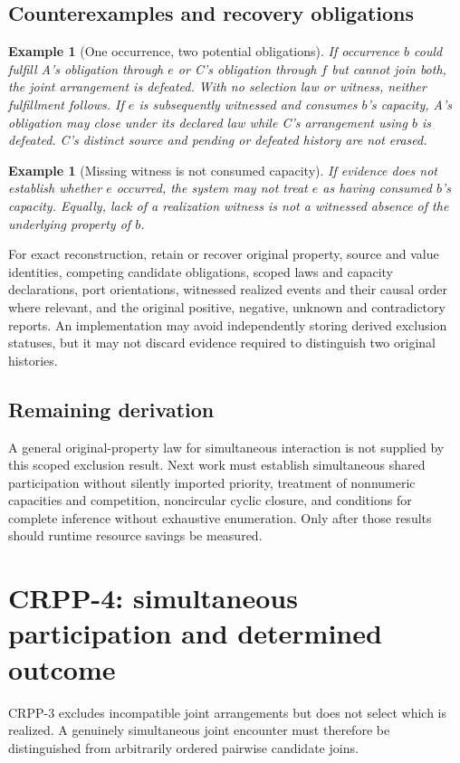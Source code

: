 \documentclass[11pt]{article}
\newtheorem{example}[definition]{Example}
\begin{document}
\subsection{Counterexamples and recovery obligations}
\begin{example}[One occurrence, two potential obligations]
If occurrence $b$ could fulfill A's obligation through $e$
or C's obligation through $f$ but cannot join both,
the joint arrangement is defeated. With no selection law or
witness, neither fulfillment follows. If $e$ is subsequently
witnessed and consumes $b$'s capacity, A's obligation may
close under its declared law while C's arrangement using $b$
is defeated. C's distinct source and pending or defeated
history are not erased.
\end{example}

\begin{example}[Missing witness is not consumed capacity]
If evidence does not establish whether $e$ occurred, the system
may not treat $e$ as having consumed $b$'s capacity. Equally,
lack of a realization witness is not a witnessed absence of
the underlying property of $b$.
\end{example}

For exact reconstruction, retain or recover original property,
source and value identities, competing candidate obligations,
scoped laws and capacity declarations, port orientations,
witnessed realized events and their causal order where relevant,
and the original positive, negative, unknown and contradictory
reports. An implementation may avoid independently storing
derived exclusion statuses, but it may not discard evidence
required to distinguish two original histories.

\subsection{Remaining derivation}
A general original-property law for simultaneous interaction
is not supplied by this scoped exclusion result. Next work
must establish simultaneous shared participation without silently
imported priority, treatment of nonnumeric capacities and
competition, noncircular cyclic closure, and conditions for
complete inference without exhaustive enumeration. Only after
those results should runtime resource savings be measured.


\section{CRPP-4: simultaneous participation and determined outcome}
\label{sec:crpp4}
CRPP-3 excludes incompatible joint arrangements but does not
select which is realized. A genuinely simultaneous joint encounter
must therefore be distinguished from arbitrarily ordered
pairwise candidate joins.
\end{document}
